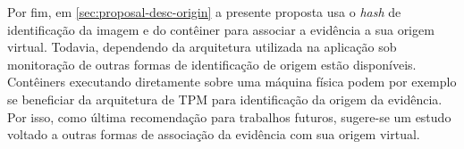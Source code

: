 Por fim, em \ref{sec:proposal-desc-origin} a presente proposta usa o \textit{hash} de identificação da imagem e do contêiner para associar a evidência a sua origem virtual.
%
Todavia, dependendo da arquitetura utilizada na aplicação sob monitoração de \fancyname outras formas de identificação de origem estão disponíveis.
%
Contêiners executando diretamente sobre uma máquina física podem por exemplo se beneficiar da arquitetura de TPM \cite{TPM} para identificação da origem da evidência.
%
Por isso, como última recomendação para trabalhos futuros, sugere-se um estudo voltado a outras formas de associação da evidência com sua origem virtual.
%
